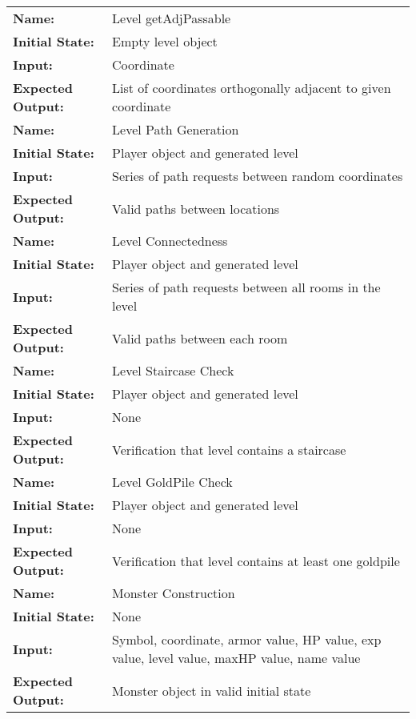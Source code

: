 \documentclass[12pt, titlepage]{article}
\begin{document}
\begin{center}
\begin{longtable}{ l | p{10cm} }
				\hline
				\rule{0pt}{2em}\textbf{Name:} & Level getAdjPassable\\
				\textbf{Initial State:} & Empty level object\\
				\textbf{Input:} & Coordinate\\
				\textbf{Expected Output:} & List of coordinates orthogonally adjacent to given coordinate\\[1em]
				\hline
				\rule{0pt}{2em}\textbf{Name:} & Level Path Generation\\
				\textbf{Initial State:} & Player object and generated level\\
				\textbf{Input:} & Series of path requests between random coordinates\\
				\textbf{Expected Output:} & Valid paths between locations\\[1em]
				\hline
				\rule{0pt}{2em}\textbf{Name:} & Level Connectedness\\
				\textbf{Initial State:} & Player object and generated level\\
				\textbf{Input:} & Series of path requests between all rooms in the level\\
				\textbf{Expected Output:} & Valid paths between each room\\[1em]
				\hline
				\rule{0pt}{2em}\textbf{Name:} & Level Staircase Check\\
				\textbf{Initial State:} & Player object and generated level\\
				\textbf{Input:} & None\\
				\textbf{Expected Output:} & Verification that level contains a staircase\\[1em]
				\hline
				\rule{0pt}{2em}\textbf{Name:} & Level GoldPile Check\\
				\textbf{Initial State:} & Player object and generated level\\
				\textbf{Input:} & None\\
				\textbf{Expected Output:} & Verification that level contains at least one goldpile\\[1em]
				\hline
				\rule{0pt}{2em}\textbf{Name:} & Monster Construction\\
				\textbf{Initial State:} & None\\
				\textbf{Input:} & Symbol, coordinate, armor value, HP value, exp value, level value, maxHP value, name value\\
				\textbf{Expected Output:} & Monster object in valid initial state\\[1em]
				\hline

\end{longtable}
\end{center}
\end{document}
